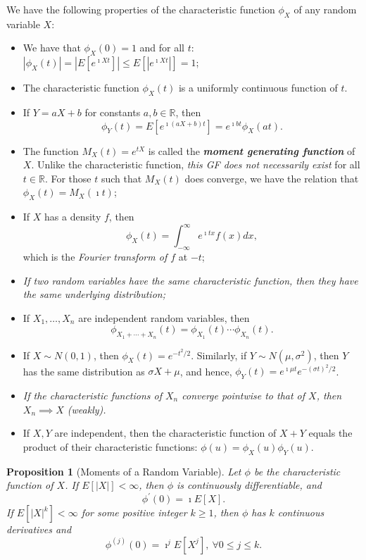 \documentclass[12pt,reqno]{article}
\renewcommand{\emph}[1]{\textit{#1}}
\theoremstyle{plain}
\newtheorem{prop}[theorem]{Proposition}
\theoremstyle{definition}
\begin{document}
We have the following properties of the characteristic function $\phi_X$ of 
any random variable $X$: 
\begin{itemize} 

\item We have that $\phi_X(0) = 1$ and for all $t$: 
     $|\phi_X(t)| = |E[e^{\imath Xt}]| \leq E[|e^{\imath Xt}|] = 1$; 
\item The characteristic function $\phi_X(t)$ is a uniformly continuous 
    function of $t$. 
\item If $Y = aX+b$ for constants $a,b \in \mathbb{R}$, then 
     $$\phi_Y(t) = E[e^{\imath(aX+b)t}] = e^{\imath bt} \phi_X(at).$$ 
\item The function $M_X(t) = e^{tX}$ is called the 
     \textbf{\emph{moment generating function}} of $X$. Unlike the characteristic 
     function, \emph{this GF does not necessarily exist} for all $t \in \mathbb{R}$. 
     For those $t$ such that $M_X(t)$ does converge, we have the 
     relation that $\phi_X(t) = M_X(\imath t)$; 
\item If $X$ has a density $f$, then 
      \[
      \phi_X(t) = \int_{-\infty}^{\infty} e^{\imath tx} f(x) dx, 
      \]
      which is the \emph{Fourier transform of $f$} at $-t$; 
\item \emph{If two random variables have the same characteristic function, then 
     they have the same underlying distribution;} 
\item If $X_1,\ldots,X_n$ are independent random variables, then 
     \[
     \phi_{X_1+\cdots+X_n}(t) = \phi_{X_1}(t) \cdots \phi_{X_n}(t). 
     \]
\item If $X \sim N(0, 1)$, then $\phi_X(t) = e^{-t^2 / 2}$. Similarly, if 
     $Y \sim N(\mu, \sigma^2)$, then $Y$ has the same distribution as 
     $\sigma X+\mu$, and hence, 
     $\phi_Y(t) = e^{\imath\mu t} e^{-(\sigma t)^2 / 2}$. 
\item \emph{If the characteristic functions of $X_n$ converge pointwise to that 
     of $X$, then $X_n \implies X$ (weakly).} 
\item If $X,Y$ are independent, then the characteristic function of 
     $X+Y$ equals the product of their characteristic functions: 
     $\phi(u) = \phi_X(u) \phi_Y(u)$. 

\end{itemize} 

\begin{prop}[Moments of a Random Variable] 
Let $\phi$ be the characteristic function of $X$. If $E[|X|] < \infty$, then 
$\phi$ is continuously differentiable, and 
\[
\phi^{\prime}(0) = \imath E[X]. 
\]
If $E[|X|^k] < \infty$ for some positive integer $k \geq 1$, then $\phi$ has 
$k$ continuous derivatives and 
\[
\phi^{(j)}(0) = \imath^j E[X^j],\ \forall 0 \leq j \leq k. 
\]
\end{prop} 
\end{document}
